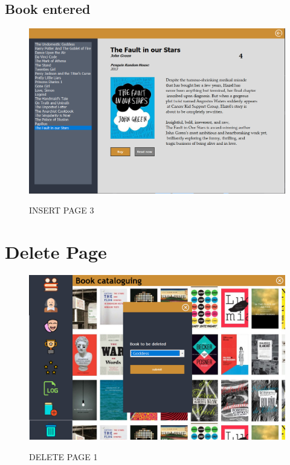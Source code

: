 \subsection{Book entered}
\begin{figure}[H]
\centering
\caption{INSERT PAGE 3}
\includegraphics[scale=.5]{./ssinsert3.png}
\\[0.2in]
\label{fig:book ent}
\end{figure}
\thispagestyle{fancy}
\section{Delete Page}
\begin{figure}[H]
\centering
\caption{DELETE PAGE 1}
\includegraphics[scale=.5]{./ssdelete.png}
\\[0.2in]
\label{fig:del}
\end{figure}
\thispagestyle{fancy}\
